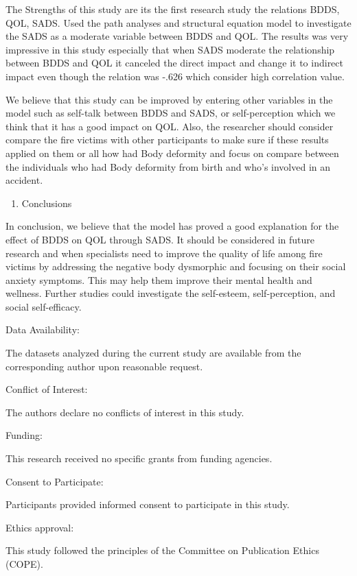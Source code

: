 \documentclass[10pt]{NSP1}
\begin{document}
The Strengths of this study are its the first research study the relations BDDS, QOL, SADS. Used the path analyses and structural equation model to investigate the SADS as a moderate variable between BDDS and QOL. The results was very impressive in this study especially that when SADS moderate the relationship between BDDS and QOL it canceled the direct impact and change it to indirect impact even though the relation was -.626 which consider high correlation value.

We believe that this study can be improved by entering other variables in the model such as self-talk between BDDS and SADS, or self-perception which we think that it has a good impact on QOL. Also, the researcher should consider compare the fire victims with other participants to make sure if these results applied on them or all how had Body deformity and focus on compare between the individuals who had Body deformity from birth and who’s involved in an accident.

\begin{enumerate}
  \item Conclusions
\end{enumerate}

In conclusion, we believe that the model has proved a good explanation for the effect of BDDS on QOL through SADS. It should be considered in future research and when specialists need to improve the quality of life among fire victims by addressing the negative body dysmorphic and focusing on their social anxiety symptoms. This may help them improve their mental health and wellness. Further studies could investigate the self-esteem, self-perception, and social self-efficacy.

Data Availability:

The datasets analyzed during the current study are available from the corresponding author upon reasonable request.

Conflict of Interest:

The authors declare no conflicts of interest in this study.

Funding:

This research received no specific grants from funding agencies.

Consent to Participate:

Participants provided informed consent to participate in this study.

Ethics approval:

This study followed the principles of the Committee on Publication Ethics (COPE).
\end{document}
